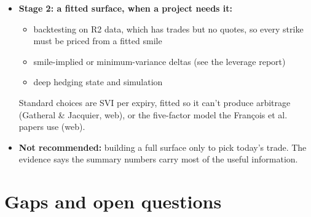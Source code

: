 \documentclass{article}
\begin{document}
\begin{itemize}
\begin{enumerate}
\item \textbf{VRP at the traded tenor:} IV at the structure's DTE minus the RV forecast, rather than VIX.

\item \textbf{Regime features} for the router, alongside the VIX term-structure ratios already collected.

\item \textbf{Structure choice:} e.g. whether puts are rich relative to calls when choosing a strangle, a straddle or an iron condor.

\end{enumerate}

\item \textbf{Stage 2: a fitted surface, when a project needs it:}

\begin{itemize}

\item backtesting on R2 data, which has trades but no quotes, so every strike must be priced from a fitted smile

\item smile-implied or minimum-variance deltas (see the leverage report)

\item deep hedging state and simulation

\end{itemize}

Standard choices are SVI per expiry, fitted so it can't produce arbitrage (Gatheral \& Jacquier, web), or the five-factor model the François et al. papers use (web).

\item \textbf{Not recommended:} building a full surface only to pick today's trade. The evidence says the summary numbers carry most of the useful information.

\end{itemize}

\section{Gaps and open questions}
\end{document}
